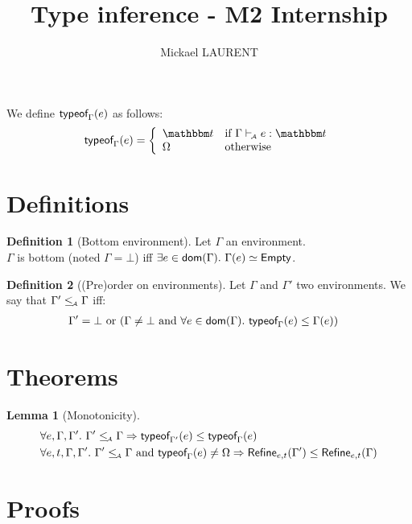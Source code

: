 \documentclass[a4paper]{article}
\title{\vspace{1.5cm}Type inference - M2 Internship}
\author{Mickael LAURENT}
\date{\vspace{-5ex}}
\theoremstyle{definition}
\newtheorem{lemma}{Lemma}
\newtheorem{definition}{Definition}
\begin{document}
  \maketitle

  We define $\textsf{typeof}_{\Gamma}(e)$ as follows:
  \begin{align*}
    \tyof e \Gamma = 
    \left\{\begin{array}{ll}
      \ts & \text{if } \Gamma \vdashA e:\ts \\
      \tsempty & \text{otherwise}
    \end{array}\right.
  \end{align*}

  \section{Definitions}

    \begin{definition}[Bottom environment]
      Let $\Gamma$ an environment.\\
      $\Gamma$ is bottom (noted $\Gamma = \bot$) iff $\exists e\in\dom\Gamma.\ \Gamma(e)\simeq\Empty$.
    \end{definition}

    \begin{definition}[(Pre)order on environments]
    Let $\Gamma$ and $\Gamma'$ two environments. We say that $\Gamma' \leq_{\!\scriptscriptstyle\mathcal{A}} \Gamma$ iff:
    \begin{align*}
        &\Gamma'=\bot \text{ or } (\Gamma\neq\bot \text{ and } \forall e \in \textsf{dom}(\Gamma).\ \textsf{typeof}_{\Gamma}(e) \leq \Gamma(e))
    \end{align*}
    \end{definition}

  \section{Theorems}

  \begin{lemma}[Monotonicity]
    \begin{align*}
      &\forall e,\Gamma,\Gamma'.\ \Gamma'\leq_{\!\scriptscriptstyle\mathcal{A}}\Gamma \Rightarrow \textsf{typeof}_{\Gamma'}(e) \leq \textsf{typeof}_{\Gamma}(e)\\
      &\forall e,t,\Gamma,\Gamma'.\ \Gamma'\leq_{\!\scriptscriptstyle\mathcal{A}}\Gamma \text{ and } \textsf{typeof}_{\Gamma}(e) \neq \Omega \Rightarrow \textsf{Refine}_{e,t}(\Gamma') \leq \textsf{Refine}_{e,t}(\Gamma)\\
    \end{align*}
  \end{lemma}

  \section{Proofs}
\end{document}

